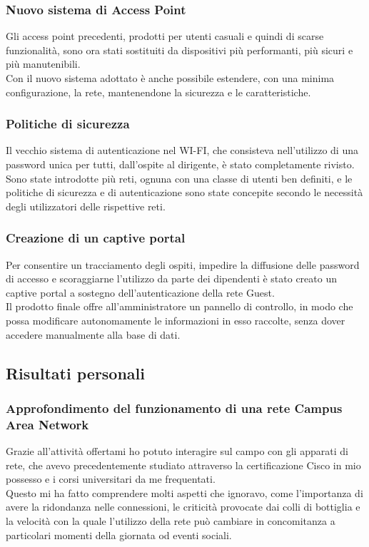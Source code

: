 \documentclass[Tesi.tex]{subfiles}
\begin{document}
\subsubsection{Nuovo sistema di Access Point}
Gli access point precedenti, prodotti per utenti casuali e quindi di scarse funzionalità, sono ora stati sostituiti da dispositivi più performanti, più sicuri e più manutenibili. \\
Con il nuovo sistema adottato è anche possibile estendere, con una minima configurazione, la rete, mantenendone la sicurezza e le caratteristiche.

\subsubsection{Politiche di sicurezza}
Il vecchio sistema di autenticazione nel WI-FI, che consisteva nell'utilizzo di una password unica per tutti, dall'ospite al dirigente, è stato completamente rivisto. \\
Sono state introdotte più reti, ognuna con una classe di utenti ben definiti, e le politiche di sicurezza e di autenticazione sono state concepite secondo le necessità degli utilizzatori delle rispettive reti.

\subsubsection{Creazione di un captive portal}
Per consentire un tracciamento degli ospiti, impedire la diffusione delle password di accesso e scoraggiarne l'utilizzo da parte dei dipendenti è stato creato un captive portal a sostegno dell'autenticazione della rete Guest. \\ 
Il prodotto finale offre all'amministratore un pannello di controllo, in modo che possa modificare autonomamente le informazioni in esso raccolte, senza dover accedere manualmente alla base di dati.

\newpage
\subsection{Risultati personali}
\subsubsection{Approfondimento del funzionamento di una rete Campus Area Network}
Grazie all'attività offertami ho potuto interagire sul campo con gli apparati di rete, che avevo precedentemente studiato attraverso la certificazione Cisco in mio possesso e i corsi universitari da me frequentati. \\
Questo mi ha fatto comprendere molti aspetti che ignoravo, come l'importanza di avere la ridondanza nelle connessioni, le criticità provocate dai colli di bottiglia e la velocità con la quale l'utilizzo della rete può cambiare in concomitanza a particolari momenti della giornata od eventi sociali.
\end{document}

